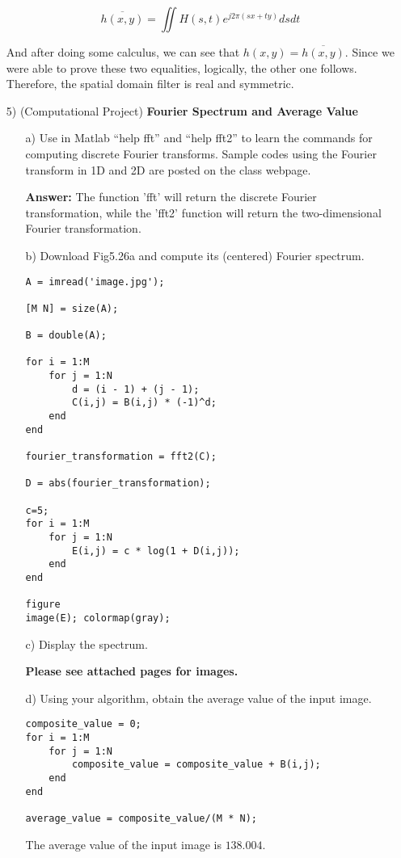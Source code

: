 \documentclass{article}
\begin{document}
\begin{enumerate}
\begin{equation}
\overline{h(x,y)} = \iint H(s, t) e^{j2\pi (sx + ty)} ds dt
\end{equation}

And after doing some calculus, we can see that $h(x,y) = \overline{h(x,y)}$.  Since we were able to prove these two equalities, logically, the other one follows.  Therefore,
the spatial domain filter is real and symmetric.

\newpage
\item[5)] (Computational Project) {\bf Fourier Spectrum and Average Value}

\begin{enumerate}
\item[a)] Use in Matlab ``help fft'' and ``help fft2'' to learn the commands for computing discrete Fourier transforms. Sample codes using the Fourier transform in 1D and 2D are posted on the class webpage. 

\textbf{Answer:} The function 'fft' will return the discrete Fourier transformation, while the 'fft2' function will return the two-dimensional Fourier transformation.

\item[b)] Download Fig5.26a and compute its (centered) Fourier spectrum.

\begin{lstlisting}
A = imread('image.jpg');

[M N] = size(A);

B = double(A);

for i = 1:M
    for j = 1:N
        d = (i - 1) + (j - 1);
        C(i,j) = B(i,j) * (-1)^d;
    end
end

fourier_transformation = fft2(C);

D = abs(fourier_transformation);

c=5; 
for i = 1:M
    for j = 1:N
        E(i,j) = c * log(1 + D(i,j));
    end
end

figure
image(E); colormap(gray);
\end{lstlisting}

\item[c)] Display the spectrum.

\textbf{Please see attached pages for images.}

\item[d)] Using your algorithm, obtain the average value of the input image.
\begin{lstlisting}
composite_value = 0;
for i = 1:M
    for j = 1:N
        composite_value = composite_value + B(i,j);
    end
end

average_value = composite_value/(M * N);

\end{lstlisting}
The average value of the input image is $138.004$.
\end{enumerate}

\end{enumerate}
\end{document}
